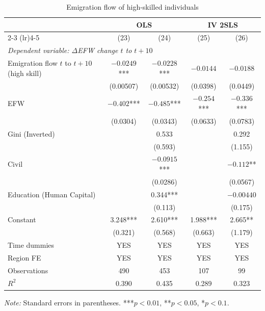 \documentclass[12pt]{article}
\begin{document}
\begin{table}[H]
\centering
\caption{Emigration flow of high-skilled individuals}
\label{tab:highskill_flow}
\begin{threeparttable}
\begin{tabular}{@{}lcccc@{}}
\toprule
 & \multicolumn{2}{c}{OLS} & \multicolumn{2}{c}{IV 2SLS} \\
\cmidrule(lr){2-3} \cmidrule(lr){4-5}
 & (23) & (24) & (25) & (26) \\
\midrule
\multicolumn{5}{l}{\textit{Dependent variable: $\Delta$EFW change $t$ to $t+10$}} \\[4pt]
Emigration flow $t$ to $t+10$ (high skill) & $-0.0249$*** & $-0.0228$*** & $-0.0144$ & $-0.0188$ \\
 & (0.00507) & (0.00532) & (0.0398) & (0.0449) \\[2pt]
EFW & $-0.402$*** & $-0.485$*** & $-0.254$*** & $-0.336$*** \\
 & (0.0304) & (0.0343) & (0.0633) & (0.0783) \\[2pt]
Gini (Inverted) & & 0.533 & & 0.292 \\
 & & (0.593) & & (1.155) \\[2pt]
Civil & & $-0.0915$*** & & $-0.112$** \\
 & & (0.0286) & & (0.0567) \\[2pt]
Education (Human Capital) & & 0.344*** & & $-0.00440$ \\
 & & (0.113) & & (0.175) \\[2pt]
Constant & 3.248*** & 2.610*** & 1.988*** & 2.665** \\
 & (0.321) & (0.568) & (0.663) & (1.179) \\[4pt]
Time dummies & YES & YES & YES & YES \\
Region FE & YES & YES & YES & YES \\
Observations & 490 & 453 & 107 & 99 \\
$R^2$ & 0.390 & 0.435 & 0.289 & 0.323 \\
\bottomrule
\end{tabular}
\begin{tablenotes}
\small
\item \textit{Note:} Standard errors in parentheses. ***$p<0.01$, **$p<0.05$, *$p<0.1$.
\end{tablenotes}
\end{threeparttable}
\end{table}
\end{document}
